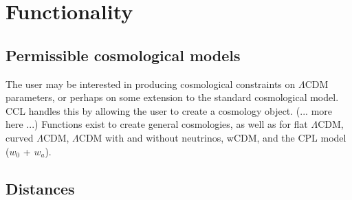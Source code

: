 \documentclass[\docopts]{\docclass}
\begin{document}

\section{Functionality}

\subsection{Permissible cosmological models}
\label{sec:cosmologies}
The user may be interested in producing cosmological constraints on $\Lambda$CDM parameters, or perhaps on some extension to the standard cosmological model. CCL handles this by allowing the user to create a cosmology object. (... more here ...) Functions exist to create general cosmologies, as well as for flat $\Lambda$CDM, curved $\Lambda$CDM, $\Lambda$CDM with and without neutrinos, wCDM, and the CPL model ($w_0$ + $w_a$).


%

\subsection{Distances}
\label{sec:distances}
\end{document}
